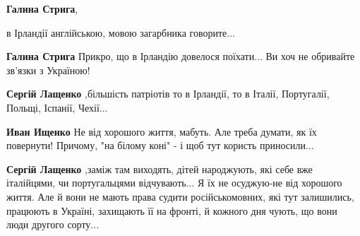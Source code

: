 \begin{itemize}
\begin{itemize}
\begin{itemize}
 
\textbf{Галина Стрига}, 

в Ірландії англійською, мовою загарбника говорите...

\end{itemize}

 
\textbf{Галина Стрига} Прикро, що в Ірландію довелося поїхати... Ви хоч не обривайте зв'язки з Україною!

\begin{itemize}
 
\textbf{Сергій Лащенко} ,більшість патріотів то в Ірландії, то в Італії, Португалії, Польщі, Іспанії, Чехії...

 
\textbf{Иван Ищенко} Не від хорошого життя, мабуть. Але треба думати, як їх повернути! Причому, "на білому коні" - і щоб тут користь приносили...
\end{itemize}

 
\textbf{Сергій Лащенко} ,заміж там виходять, дітей народжують, які себе вже
італійцями, чи португальцями відчувають... Я їх не осуджую-не від хорошого
життя. Але й вони не мають права судити російськомовних, які тут
залишились, працюють в Україні, захищають її на фронті, й кожного дня чують, що
вони люди другого сорту...


\end{itemize}
\end{itemize}
